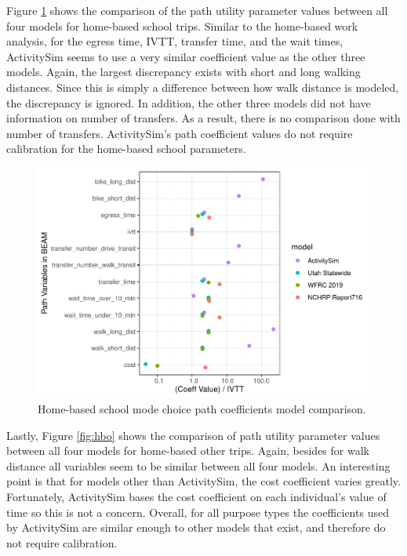 \documentclass[fancy, masters]{byuthesis}
\begin{document}
Figure \ref{fig:hbs} shows the comparison of the path utility parameter values between all four models for home-based school trips. Similar to the home-based work analysis, for the egress time, IVTT, transfer time, and the wait times, ActivitySim seems to use a very similar coefficient value as the other three models. Again, the largest discrepancy exists with short and long walking distances. Since this is simply a difference between how walk distance is modeled, the discrepancy is ignored. In addition, the other three models did not have information on number of transfers. As a result, there is no comparison done with number of transfers. ActivitySim's path coefficient values do not require calibration for the home-based school parameters.

\begin{figure}

{\centering \includegraphics{thesis_files/figure-latex/hbs-1} 

}

\caption{Home-based school mode choice path coefficients model comparison.}\label{fig:hbs}
\end{figure}

Lastly, Figure \ref{fig:hbo} shows the comparison of path utility parameter values between all four models for home-based other trips. Again, besides for walk distance all variables seem to be similar between all four models. An interesting point is that for models other than ActivitySim, the cost coefficient varies greatly. Fortunately, ActivitySim bases the cost coefficient on each individual's value of time so this is not a concern. Overall, for all purpose types the coefficients used by ActivitySim are similar enough to other models that exist, and therefore do not require calibration.
\end{document}
